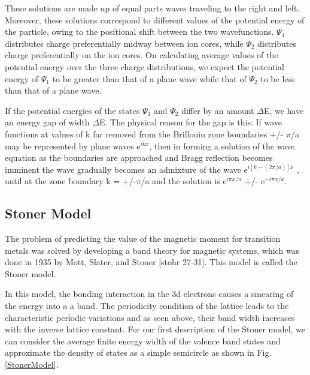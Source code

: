 These solutions are made up of equal parts waves traveling to the right and left. Moreover, these solutions correspond to different values of the potential energy of the particle, owing to the positional shift between the two wavefunctions. $\Psi_1$ distributes charge preferentially midway between ion cores, while $\Psi_2$ distributes charge preferentially on the ion cores. On calculating average values of the potential energy over the three charge distributions, we expect the potential energy of $\Psi_1$ to be greater than that of a plane wave while that of $\Psi_2$ to be less than that of a plane wave.

If the potential energies of the states  $\Psi_1$ and $\Psi_2$ differ by an amount $\Delta$E, we have an energy gap  of width $\Delta$E. The physical reason for the gap is this: If wave functions at values of k far removed from the Brillouin zone boundaries +/- $\pi$/a may be represented by plane waves e$^{ikx}$, then in forming a solution of the wave equation as the boundaries are approached and Bragg reflection becomes imminent the wave gradually becomes an admixture of the wave e$^{i[k-(2\pi/a)]x}$ , until at the zone boundary k = +/-$\pi$/a and the solution is e$^{i\pi x/a}$ +/- e$^{-i\pi x /a}$. 

\subsection{Stoner Model}
The problem of predicting the value of the magnetic moment for transition metals was solved by developing a band theory for magnetic systems, which was done in 1935 by Mott, Slater, and Stoner [stohr 27-31]. This model is called the Stoner model. 

In this model, the bonding interaction in the 3d electrons causes a smearing of the energy into a a band. The periodicity condition of the lattice leads to the characteristic periodic variations and as seen above, their band width increases with the inverse lattice constant. For our first description of the Stoner model, we can consider the average finite energy width of the valence band states and approximate the density of states as a simple semicircle as shown in Fig. \ref{StonerModel}.


